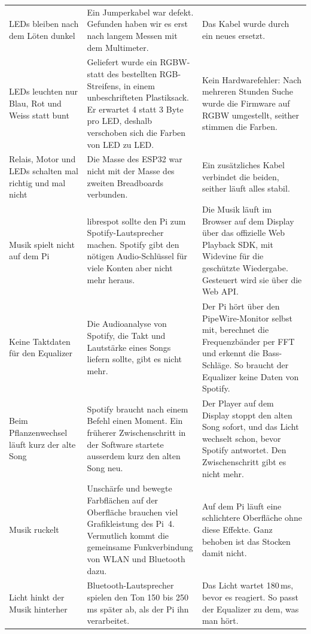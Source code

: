 \documentclass[11pt,a4paper]{article}
\begin{document}
{\begin{xltabular}{\linewidth}{>{\raggedright\arraybackslash}p{3.3cm}>{\raggedright\arraybackslash}p{5.4cm}L}
\addlinespace
LEDs bleiben nach dem Löten dunkel & Ein Jumperkabel war defekt. Gefunden haben wir es erst nach langem Messen mit dem Multimeter. & Das Kabel wurde durch ein neues ersetzt. \\
\addlinespace
LEDs leuchten nur Blau, Rot und Weiss statt bunt & Geliefert wurde ein RGBW- statt des bestellten RGB-Streifens, in einem unbeschrifteten Plastiksack. Er erwartet 4 statt 3 Byte pro LED, deshalb verschoben sich die Farben von LED zu LED. & Kein Hardwarefehler: Nach mehreren Stunden Suche wurde die Firmware auf RGBW umgestellt, seither stimmen die Farben. \\
\addlinespace
Relais, Motor und LEDs schalten mal richtig und mal nicht & Die Masse des ESP32 war nicht mit der Masse des zweiten Breadboards verbunden. & Ein zusätzliches Kabel verbindet die beiden, seither läuft alles stabil. \\
\addlinespace
Musik spielt nicht auf dem Pi & librespot sollte den Pi zum Spotify-Lautsprecher machen. Spotify gibt den nötigen Audio-Schlüssel für viele Konten aber nicht mehr heraus. & Die Musik läuft im Browser auf dem Display über das offizielle Web Playback SDK, mit Widevine für die geschützte Wiedergabe. Gesteuert wird sie über die Web API. \\
\addlinespace
Keine Taktdaten für den Equalizer & Die Audioanalyse von Spotify, die Takt und Lautstärke eines Songs liefern sollte, gibt es nicht mehr. & Der Pi hört über den PipeWire-Monitor selbst mit, berechnet die Frequenzbänder per FFT und erkennt die Bass-Schläge. So braucht der Equalizer keine Daten von Spotify. \\
\addlinespace
Beim Pflanzenwechsel läuft kurz der alte Song & Spotify braucht nach einem Befehl einen Moment. Ein früherer Zwischenschritt in der Software startete ausserdem kurz den alten Song neu. & Der Player auf dem Display stoppt den alten Song sofort, und das Licht wechselt schon, bevor Spotify antwortet. Den Zwischenschritt gibt es nicht mehr. \\
\addlinespace
Musik ruckelt & Unschärfe und bewegte Farbflächen auf der Oberfläche brauchen viel Grafikleistung des Pi~4. Vermutlich kommt die gemeinsame Funkverbindung von WLAN und Bluetooth dazu. & Auf dem Pi läuft eine schlichtere Oberfläche ohne diese Effekte. Ganz behoben ist das Stocken damit nicht. \\
\addlinespace
Licht hinkt der Musik hinterher & Bluetooth-Lautsprecher spielen den Ton 150 bis 250\,ms später ab, als der Pi ihn verarbeitet. & Das Licht wartet 180\,ms, bevor es reagiert. So passt der Equalizer zu dem, was man hört. \\
\end{xltabular}}
\end{document}
